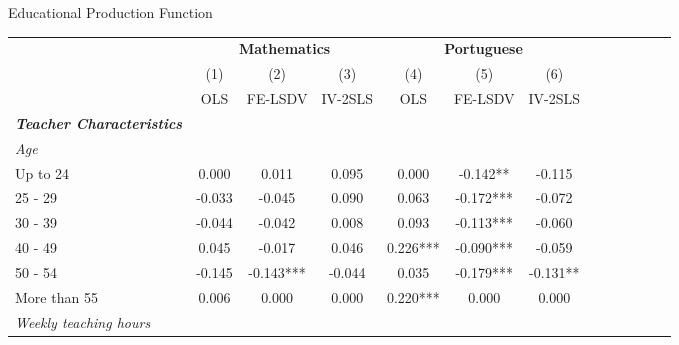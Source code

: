 \documentclass{beamer}
\begin{document}
\begin{frame}{Educational Production Function}
\vspace{-27pt} \flushright \hyperlink{Mirror}{\beamerbutton{\textcolor{red}{Mirror}}}
\vspace{-7pt}
\begin{table}
\begin{adjustbox}{max width=\textwidth} 
\begin{tabular}{l*{6}{cc}}
\toprule
& \multicolumn{3}{c}{\textbf{Mathematics}} &                      \multicolumn{3}{c}{\textbf{Portuguese}} \\            \cline{2-4}              \cline{5-7}                    
                    &\multicolumn{1}{c}{(1)}   &\multicolumn{1}{c}{(2)}   &\multicolumn{1}{c}{(3)}   &\multicolumn{1}{c}{(4)}   &\multicolumn{1}{c}{(5)}   &\multicolumn{1}{c}{(6)}   \\
                    &         OLS   &     FE-LSDV   &     IV-2SLS   &         OLS   &     FE-LSDV   &     IV-2SLS   \vspace{-2pt}\\
\midrule
\textbf{\emph{Teacher Characteristics}}&               &               &               &               &               &               \\ 
\emph{Age}          &               &               &               &               &               &               \\
Up to 24            &       0.000   &       0.011   &       0.095   &       0.000   &      -0.142** &      -0.115   \\
25 - 29             &      -0.033   &      -0.045   &       0.090   &       0.063   &      -0.172***&      -0.072   \\
30 - 39             &      -0.044   &      -0.042   &       0.008   &       0.093   &      -0.113***&      -0.060   \\
40 - 49             &       0.045   &      -0.017   &       0.046   &       0.226***&      -0.090***&      -0.059   \\
50 - 54             &      -0.145   &      -0.143***&      -0.044   &       0.035   &      -0.179***&      -0.131** \\
More than 55        &       0.006   &       0.000   &       0.000   &       0.220***&       0.000   &       0.000   \\
\emph{Weekly teaching hours}&               &               &               &               &               &               \\

\end{tabular}
\end{adjustbox}
\end{table}
\end{frame}
\end{document}
